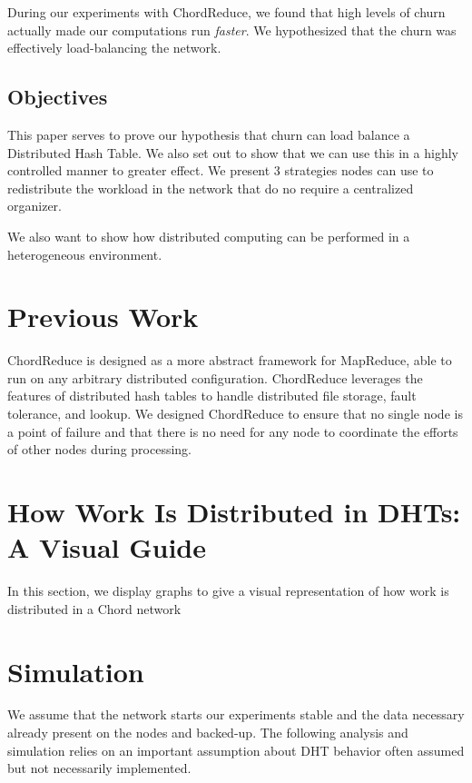 During our experiments with ChordReduce, we found that high levels of churn actually made our computations run \textit{faster}.
We hypothesized that the churn was effectively load-balancing the network.

\subsection{Objectives}
This paper serves to prove our hypothesis that churn can load balance a Distributed Hash Table.
We also set out to show that we can use this in a highly controlled manner to greater effect.
We present 3 strategies nodes can use to redistribute the workload in the network that do no require a centralized organizer.

We also want to show how distributed computing can be performed in a heterogeneous environment.

\section{Previous Work}


ChordReduce \cite{chordreduce} is designed as a more abstract framework for MapReduce, able to run on any arbitrary distributed configuration.
ChordReduce leverages the features of distributed hash tables to handle distributed file storage, fault tolerance, and lookup.
We designed ChordReduce to ensure that no single node is a point of failure and that there is no need for any node to coordinate the efforts of other nodes during processing.

\section{How Work Is Distributed in DHTs: A Visual Guide}
In this section, we display graphs to give a visual representation of how work is distributed in a Chord \cite{chord} network

\section{Simulation}


We assume that the network starts our experiments stable and the data necessary already present on the nodes and backed-up.
The following analysis and simulation relies on an important assumption about DHT behavior often assumed but not necessarily implemented.

